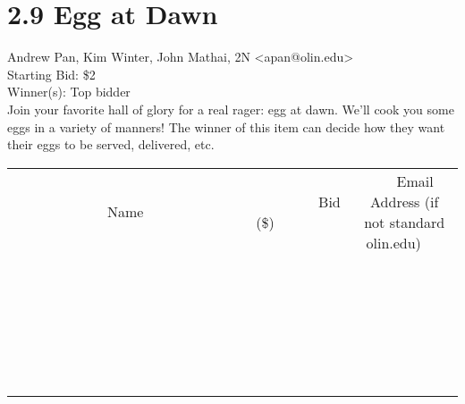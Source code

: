 \documentclass[11pt]{article}
\begin{document}
					\section*{2.9 Egg at Dawn}
					Andrew Pan, Kim Winter, John Mathai, 2N <apan@olin.edu> \\
					Starting Bid: \$2 \\
					Winner(s): Top bidder \\
					Join your favorite hall of glory for a real rager: egg at dawn.  We'll cook you some eggs in a variety of manners!  The winner of this item can decide how they want their eggs to be served, delivered, etc. \\
					[6ex]
					\begin{tabular}{c c c}
						~~~~~~~~~~~~~Name~~~~~~~~~~~~~ & ~~~~~~~~~Bid (\$)~~~~~~~~~ & ~~~Email Address (if not standard olin.edu)~~~ \\
				
 & & \\
\hline
 & & \\
\hline
 & & \\
\hline
 & & \\
\hline
 & & \\
\hline
 & & \\
\hline
 & & \\
\hline
 & & \\
\hline
 & & \\
\hline
 & & \\
\hline
 & & \\
\hline
 & & \\
\hline
 & & \\
\hline
 & & \\
\hline
 & & \\
\hline
 & & \\
\hline
 & & \\
\hline
 & & \\
\hline
 & & \\
\hline
 & & \\
\hline
 & & \\
\hline
 & & \\
\hline
 & & \\
\hline
 & & \\
\hline
 & & \\
\hline
 & & \\
\hline
					\end{tabular}
					\clearpage
				
\end{document}
